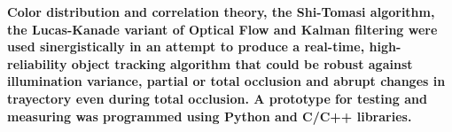 \textbf{Color distribution and correlation theory, the Shi-Tomasi algorithm, the Lucas-Kanade variant of Optical Flow and Kalman filtering were used sinergistically in an attempt to produce a real-time, high-reliability object tracking algorithm that could be robust against illumination variance, partial or total occlusion and abrupt changes in trayectory even during total occlusion. A prototype for testing and measuring was programmed using Python and C/C++ libraries. \color{red}{aca escribir un resumido sobre los resultados que obtengamos.}}




